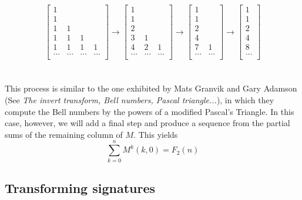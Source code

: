 \documentclass{article}
\begin{document}
\begin{equation}\begin{bmatrix}
    1 \\
    1 \\
    1  & 1 \\
    1 & 1 & 1 \\
    1 & 1 & 1 & 1 \\
    \dots & \dots & \dots & \dots \\
\end{bmatrix}
\rightarrow
\begin{bmatrix}
    1 \\
    1 \\
    2  \\
    3 & 1 \\
    4 & 2 & 1\\
    \dots & \dots & \dots \\
\end{bmatrix}
\rightarrow
\begin{bmatrix}
    1\\
    1\\
    2 \\
    4\\
    7 & 1\\
    \dots & \dots\\
\end{bmatrix}
\rightarrow
\begin{bmatrix}
    1 \\
    1 \\
    2\\
    4\\
    8\\
    \dots\\
\end{bmatrix}\end{equation}\\\\

\noindent This process is similar to the one exhibited by Mats Granvik and Gary Adamson (See \textit{The invert transform, Bell numbers, Pascal triangle...}), in which they compute the Bell numbers by the powers of a modified Pascal's Triangle. In this case, however, we will add a final step and produce a sequence from the partial sums of the remaining column of $M$. This yields \begin{equation}\sum_{k=0}^{n} M^{k}(k, 0) = F_2(n)\end{equation}

\subsection{Transforming signatures}
\end{document}
